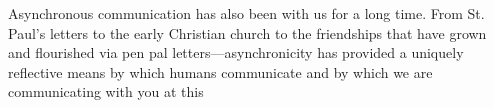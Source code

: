 \documentclass [10pt,a4paper]{book}
\begin{document}
Asynchronous communication has also been with us for a long time. From St.
Paul’s letters to the early Christian church to the friendships that have grown and
flourished via pen pal letters—asynchronicity has provided a uniquely reflective means
by which humans communicate and by which we are communicating with you at this
\end{document}
